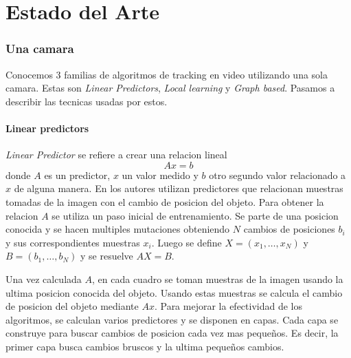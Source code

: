 \documentclass[a4paper,10pt]{article}
\title{}
\date{20 de Septiembre de 2013}
\author{Civile, Juan Pablo \and Crespo, Álvaro \and Ordano, Esteban }
\begin{document}
\pagestyle{fancy}
\maketitle
\thispagestyle{fancy}

\begin{customabstract}
\textbf{
}
\end{customabstract}

\begin{keywords}
\end{keywords}

\newpage

\part*{Estado del Arte}


\section{Una camara}

Conocemos 3 familias de algoritmos de tracking en video utilizando una sola camara.
Estas son \textit{Linear Predictors}, \textit{Local learning} y \textit{Graph based}.
Pasamos a describir las tecnicas usadas por estos.

\subsection{Linear predictors}

\textit{Linear Predictor} se refiere a crear una relacion lineal \[ Ax = b \] donde $A$ es un predictor, $x$ un valor medido y $b$ otro segundo valor relacionado a $x$ de alguna manera.
En \cite{alp, original-linear-predictors} los autores utilizan predictores que relacionan muestras tomadas de la imagen con el cambio de posicion del objeto.
Para obtener la relacion $A$ se utiliza un paso inicial de entrenamiento.
Se parte de una posicion conocida y se hacen multiples mutaciones obteniendo $N$ cambios de posiciones $b_i$ y sus correspondientes muestras $x_i$.
Luego se define $X = (x_1, \dots, x_N)$ y $B = (b_1, \dots, b_N)$ y se resuelve $AX = B$.

Una vez calculada $A$, en cada cuadro se toman muestras de la imagen usando la ultima posicion conocida del objeto.
Usando estas muestras se calcula el cambio de posicion del objeto mediante $Ax$.
Para mejorar la efectividad de los algoritmos, se calculan varios predictores y se disponen en capas.
Cada capa se construye para buscar cambios de posicion cada vez mas pequeños.
Es decir, la primer capa busca cambios bruscos y la ultima pequeños cambios.
\end{document}
